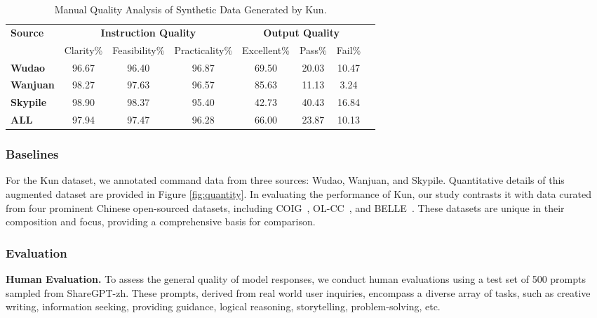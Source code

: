 \begin{table*}[htbp]
\begin{centering}
\small
\begin{tabular*}{\textwidth}{@{\extracolsep{\fill}}lccccccc}
\toprule[1pt] 
\multirow{2}{*}{ \textbf{Source} } 
& \multicolumn{3}{c}{ \textbf{Instruction Quality} } & \multicolumn{3}{c}{ \textbf{Output Quality} }  \\
 & Clarity\% & Feasibility\% & Practicality\% & Excellent\% & Pass\% & Fail\%  \\
\midrule[1pt] 
\textbf{Wudao}        & 96.67          & 96.40           & 96.87            & 69.50           & 20.03              & 10.47    
\\
\textbf{Wanjuan}    & 98.27          & 97.63           & 96.57            & 85.63           & 11.13              & 3.24    
\\
\textbf{Skypile}      & 98.90          & 98.37           & 95.40            & 42.73           & 40.43              & 16.84    
\\ \midrule 
\textbf{ALL}     & 97.94          & 97.47            & 96.28            & 66.00           & 23.87              & 10.13    
\\
\bottomrule[1pt]
\end{tabular*}
\end{centering}
\caption{Manual Quality Analysis of Synthetic Data Generated by Kun.}\label{tab:statistics}
\end{table*}
\subsubsection{Baselines}

For the Kun dataset, we annotated command data from three sources: Wudao, Wanjuan, and Skypile. Quantitative details of this augmented dataset are provided in Figure \ref{fig:quantity}. In evaluating the performance of Kun, our study contrasts it with data curated from four prominent Chinese open-sourced datasets, including COIG~\citep{zhang2023chinese,coig-pc,coig-pc-lite}, OL-CC~\citep{olcc}, and BELLE~\citep{ji2023exploring}. These datasets are unique in their composition and focus, providing a comprehensive basis for comparison. 

\subsubsection{Evaluation}
\label{sec: model evaluation}
\noindent
\textbf{Human Evaluation.} To assess the general quality of model responses, we conduct human evaluations using a test set of 500 prompts sampled from ShareGPT-zh. These prompts, derived from real world user inquiries, encompass a diverse array of tasks, such as creative writing, information seeking, providing guidance, logical reasoning, storytelling, problem-solving, etc.

